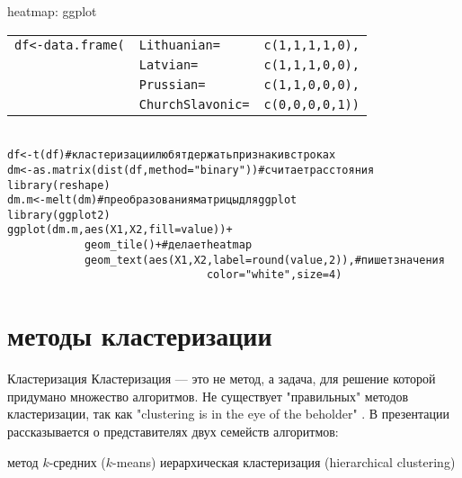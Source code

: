 \begin{frame}{heatmap: ggplot}
\scriptsize
\begin{alltt}
\begin{tabular}{lll}
df <- data.frame(& Lithuanian = & c(1, 1, 1, 1, 0), \\ 
 & Latvian = & c(1, 1, 1, 0, 0), \\ 
 & Prussian = & c(1, 1, 0, 0, 0), \\ 
 & ChurchSlavonic = & c(0, 0, 0, 0, 1)) \\ 
\end{tabular}
\\
df <- t(df) \hfill \# кластеризации любят держать признаки в строках\\
dm <- as.matrix(dist(df, method = "binary")) \hfill \# считает расстояния \bigskip\\
library(reshape) \hfill\\
dm.m <- melt(dm) \hfill \# преобразования матрицы для ggplot \bigskip\\

library(ggplot2)\\
ggplot(dm.m, aes(X1, X2, fill=value)) +  \\
~~~~~~~~~~~~\alert{geom\_tile}()+ \hfill \# делает heatmap\\
~~~~~~~~~~~~\alert{geom\_text}(aes(X1, X2, label = \alert{round(}value, 2\alert{)}), \hfill \# пишет значения\\
~~~~~~~~~~~~~~~~~~~~~~~~~~~~~~~color = "white"{}, size = 4)
\end{alltt}
\normalsize
\end{frame}

\section{методы кластеризации}
\begin{frame}{Кластеризация}
Кластеризация — это не метод, а задача, для решение которой придумано множество алгоритмов. Не существует "правильных" методов кластеризации, так как "clustering is in the eye of the beholder" \citep{estivill02}. В презентации рассказывается о представителях двух семейств алгоритмов:
\begin{itemize}
\mytem метод $k$-средних ($k$-means)
\mytem иерархическая кластеризация (hierarchical clustering)
\end{itemize}
\end{frame}
